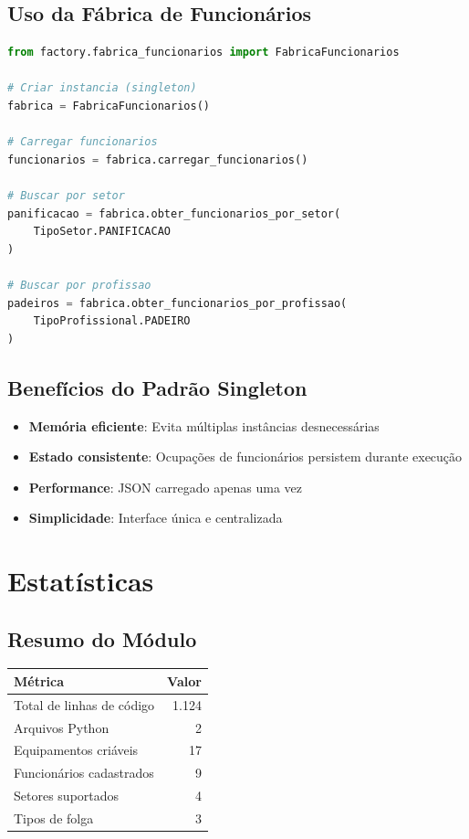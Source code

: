 \documentclass[11pt,a4paper]{article}
\begin{document}
\subsection{Uso da Fábrica de Funcionários}

\begin{lstlisting}[language=Python]
from factory.fabrica_funcionarios import FabricaFuncionarios

# Criar instancia (singleton)
fabrica = FabricaFuncionarios()

# Carregar funcionarios
funcionarios = fabrica.carregar_funcionarios()

# Buscar por setor
panificacao = fabrica.obter_funcionarios_por_setor(
    TipoSetor.PANIFICACAO
)

# Buscar por profissao
padeiros = fabrica.obter_funcionarios_por_profissao(
    TipoProfissional.PADEIRO
)
\end{lstlisting}

\subsection{Benefícios do Padrão Singleton}

\begin{itemize}
    \item \textbf{Memória eficiente}: Evita múltiplas instâncias desnecessárias
    \item \textbf{Estado consistente}: Ocupações de funcionários persistem durante execução
    \item \textbf{Performance}: JSON carregado apenas uma vez
    \item \textbf{Simplicidade}: Interface única e centralizada
\end{itemize}

\newpage

\section{Estatísticas}

\subsection{Resumo do Módulo}

\begin{tabular}{lr}
\textbf{Métrica} & \textbf{Valor} \\
\hline
Total de linhas de código & 1.124 \\
Arquivos Python & 2 \\
Equipamentos criáveis & 17 \\
Funcionários cadastrados & 9 \\
Setores suportados & 4 \\
Tipos de folga & 3 \\
\hline
\end{tabular}
\end{document}
